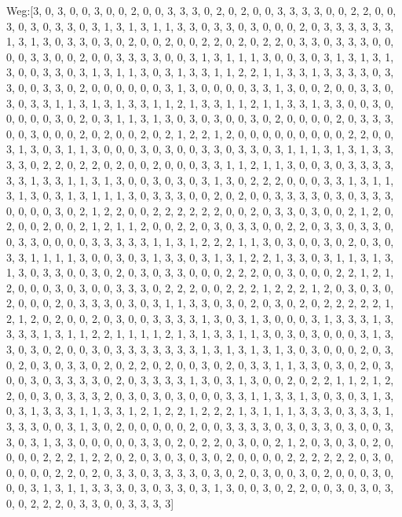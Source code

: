 \documentclass[a4paper,10pt,ngerman]{scrartcl}
\begin{document}
Weg:[3, 0, 3, 0, 0, 3, 0, 0, 2, 0, 0, 3, 3, 3, 0, 2, 0, 2, 0, 0, 3, 3, 3, 3, 0, 0, 2, 2, 0, 0, 3, 0, 3, 0, 3, 3, 0, 3, 1, 3, 1, 3, 1, 1, 3, 3, 0, 3, 3, 0, 3, 0, 0, 0, 2, 0, 3, 3, 3, 3, 3, 3, 1, 3, 1, 3, 0, 3, 3, 0, 3, 0, 2, 0, 0, 2, 0, 0, 2, 2, 0, 2, 0, 2, 2, 0, 3, 3, 0, 3, 3, 3, 0, 0, 0, 0, 3, 3, 0, 0, 2, 0, 0, 3, 3, 3, 3, 0, 0, 3, 1, 3, 1, 1, 1, 3, 0, 0, 3, 0, 3, 1, 3, 1, 3, 1, 3, 0, 0, 3, 3, 0, 3, 1, 3, 1, 1, 3, 0, 3, 1, 3, 3, 1, 1, 2, 2, 1, 1, 3, 3, 1, 3, 3, 3, 3, 0, 3, 3, 0, 0, 3, 3, 0, 2, 0, 0, 0, 0, 0, 0, 3, 1, 3, 0, 0, 0, 0, 3, 3, 1, 3, 0, 0, 2, 0, 0, 3, 3, 0, 3, 0, 3, 3, 1, 1, 3, 1, 3, 1, 3, 3, 1, 1, 2, 1, 3, 3, 1, 1, 2, 1, 1, 3, 3, 1, 3, 3, 0, 0, 3, 0, 0, 0, 0, 0, 3, 0, 2, 0, 3, 1, 1, 3, 1, 3, 0, 3, 0, 3, 0, 0, 3, 0, 2, 0, 0, 0, 0, 2, 0, 3, 3, 3, 0, 0, 3, 0, 0, 0, 2, 0, 2, 0, 0, 2, 0, 2, 1, 2, 2, 1, 2, 0, 0, 0, 0, 0, 0, 0, 0, 0, 2, 2, 0, 0, 3, 1, 3, 0, 3, 1, 1, 3, 0, 0, 0, 3, 0, 3, 0, 0, 3, 3, 0, 3, 3, 0, 3, 1, 1, 1, 3, 1, 3, 1, 3, 3, 3, 3, 0, 2, 2, 0, 2, 2, 0, 2, 0, 0, 2, 0, 0, 0, 3, 3, 1, 1, 2, 1, 1, 3, 0, 0, 3, 0, 3, 3, 3, 3, 3, 3, 1, 3, 3, 1, 1, 3, 1, 3, 0, 0, 3, 0, 3, 0, 3, 1, 3, 0, 2, 2, 2, 0, 0, 0, 3, 3, 1, 3, 1, 1, 3, 1, 3, 0, 3, 1, 3, 1, 1, 1, 3, 0, 3, 3, 3, 0, 0, 2, 0, 2, 0, 0, 3, 3, 3, 3, 0, 3, 0, 3, 3, 3, 0, 0, 0, 0, 3, 0, 2, 1, 2, 2, 0, 0, 2, 2, 2, 2, 2, 2, 0, 0, 2, 0, 3, 3, 0, 3, 0, 0, 2, 1, 2, 0, 2, 0, 0, 2, 0, 0, 2, 1, 2, 1, 1, 2, 0, 0, 2, 2, 0, 3, 0, 3, 3, 0, 0, 2, 2, 0, 3, 3, 0, 3, 3, 0, 0, 3, 3, 0, 0, 0, 0, 3, 3, 3, 3, 3, 1, 1, 3, 1, 2, 2, 2, 1, 1, 3, 0, 3, 0, 0, 3, 0, 2, 0, 3, 0, 3, 3, 1, 1, 1, 1, 3, 0, 0, 3, 0, 3, 1, 3, 3, 0, 3, 1, 3, 1, 2, 2, 1, 3, 3, 0, 3, 1, 1, 3, 1, 3, 1, 3, 0, 3, 3, 0, 0, 3, 0, 2, 0, 3, 0, 3, 3, 0, 0, 0, 2, 2, 2, 0, 0, 3, 0, 0, 0, 2, 2, 1, 2, 1, 2, 0, 0, 0, 3, 0, 3, 0, 0, 3, 3, 3, 0, 2, 2, 2, 0, 0, 2, 2, 2, 1, 2, 2, 2, 1, 2, 0, 3, 0, 3, 0, 2, 0, 0, 0, 2, 0, 3, 3, 3, 0, 3, 0, 3, 1, 1, 3, 3, 0, 3, 0, 2, 0, 3, 0, 2, 0, 2, 2, 2, 2, 2, 1, 2, 1, 2, 0, 2, 0, 0, 2, 0, 3, 0, 0, 3, 3, 3, 3, 1, 3, 0, 3, 1, 3, 0, 0, 0, 3, 1, 3, 3, 3, 1, 3, 3, 3, 3, 1, 3, 1, 1, 2, 2, 1, 1, 1, 1, 2, 1, 3, 1, 3, 3, 1, 1, 3, 0, 3, 0, 3, 0, 0, 0, 3, 1, 3, 3, 0, 3, 0, 2, 0, 0, 3, 0, 3, 3, 3, 3, 3, 3, 3, 1, 3, 1, 3, 1, 3, 1, 3, 0, 3, 0, 0, 0, 2, 0, 3, 0, 2, 0, 3, 0, 3, 3, 0, 2, 0, 2, 2, 0, 2, 0, 0, 3, 0, 2, 0, 3, 3, 1, 1, 3, 3, 0, 3, 0, 2, 0, 3, 0, 0, 3, 0, 3, 3, 3, 3, 0, 2, 0, 3, 3, 3, 3, 1, 3, 0, 3, 1, 3, 0, 0, 2, 0, 2, 2, 1, 1, 2, 1, 2, 2, 0, 0, 3, 0, 3, 3, 3, 2, 0, 3, 0, 3, 0, 3, 0, 0, 0, 3, 3, 1, 1, 3, 3, 1, 3, 0, 3, 0, 3, 1, 3, 0, 3, 1, 3, 3, 3, 1, 1, 3, 3, 1, 2, 1, 2, 2, 1, 2, 2, 2, 1, 3, 1, 1, 1, 3, 3, 3, 0, 3, 3, 3, 1, 3, 3, 3, 0, 0, 3, 1, 3, 0, 2, 0, 0, 0, 0, 0, 2, 0, 0, 3, 3, 3, 3, 0, 3, 0, 3, 3, 0, 3, 0, 0, 3, 3, 0, 3, 1, 3, 3, 0, 0, 0, 0, 0, 3, 3, 0, 2, 0, 2, 2, 0, 3, 0, 0, 2, 1, 2, 0, 3, 0, 3, 0, 2, 0, 0, 0, 0, 2, 2, 2, 1, 2, 2, 0, 2, 0, 3, 0, 3, 0, 3, 0, 2, 0, 0, 0, 0, 2, 2, 2, 2, 2, 2, 0, 3, 0, 0, 0, 0, 0, 2, 2, 0, 2, 0, 3, 3, 0, 3, 3, 3, 3, 0, 3, 0, 2, 0, 3, 0, 0, 3, 0, 2, 0, 0, 0, 3, 0, 0, 0, 3, 1, 3, 1, 1, 3, 3, 3, 0, 3, 0, 3, 3, 0, 3, 1, 3, 0, 0, 3, 0, 2, 2, 0, 0, 3, 0, 3, 0, 3, 0, 0, 2, 2, 2, 0, 3, 3, 0, 0, 3, 3, 3, 3]
\end{document}
